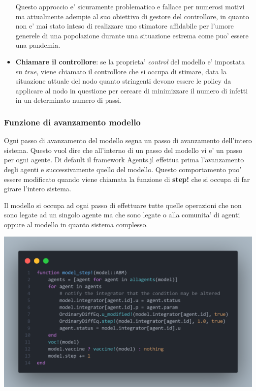 \begin{itemize}
	Questo approccio e' sicuramente problematico e fallace per numerosi motivi ma attualmente 
	adempie al suo obiettivo di gestore del controllore, in quanto non e' mai stato inteso di 
	realizzare uno stimatore affidabile per l'umore generele di una popolazione durante una situazione
	estrema come puo' essere una pandemia.
	\item \textbf{Chiamare il controllore}: se la proprieta' \emph{control} del modello e' impostata su
	\emph{true}, viene chiamato il controllore che si occupa di stimare, data la situazione attuale del nodo
	quanto stringenti devono essere le policy da applicare al nodo in questione per cercare di minimizzare il 
	numero di infetti in un determinato numero di passi. 
\end{itemize}

\subsubsection{Funzione di avanzamento modello}
Ogni passo di avanzamento del modello segna un passo di avanzamento dell'intero sistema. 
Questo vuol dire che all'interno di un passo del modello vi e' un passo per ogni agente. Di default
il framework Agents.jl effettua prima l'avanzamento degli agenti e successivamente quello del modello.
Questo comportamento puo' essere modificato quando viene chiamata la funzione di \textbf{step!} che 
si occupa di far girare l'intero sistema.

Il modello si occupa ad ogni passo di effettuare tutte quelle operazioni che non sono legate ad un
singolo agente ma che sono legate o alla comunita' di agenti oppure al modello in quanto sistema complesso. 

\begin{minipage}{\linewidth}
	\centering
	\includegraphics[width=\textwidth]{img/model_step.png}
	\label{fig:model_step}
\end{minipage}

